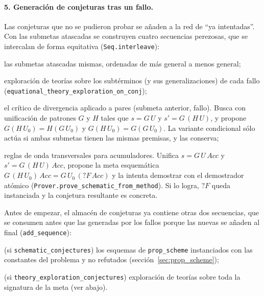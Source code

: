 \documentclass[11pt,a4paper]{article}
\newcommand{\isa}[1]{\texttt{#1}}
\theoremstyle{definition}
\theoremstyle{remark}
\begin{document}
\paragraph{5. Generación de conjeturas tras un fallo.}
Las conjeturas que no se pudieron probar se añaden a la red de ``ya intentadas''. Con
las submetas atascadas se construyen cuatro secuencias perezosas, que se intercalan
de forma equitativa (\isa{Seq.interleave}):
\begin{description}[nosep,font=\normalfont\ttfamily]
  \item[EQ\_FROM\_FAILURE] las submetas atascadas mismas, ordenadas de más general
        a menos general;
  \item[TX\_ON\_FAILURES] exploración de teorías sobre los subtérminos (y sus
        generalizaciones) de cada fallo
        (\isa{equational\_theory\_exploration\_on\_conj});
  \item[WALSH] el crítico de divergencia aplicado a pares (submeta anterior, fallo).
        Busca con unificación de patrones $G$ y $H$ tales que $s = G\,U$ y
        $s' = G\,(H\,U)$, y propone $G(H\,U_0) = H(G\,U_0)$ y
        $G(H\,U_0) = G(G\,U_0)$. La variante condicional sólo actúa si ambas
        submetas tienen las mismas premisas, y las conserva;
  \item[TRANSVERSE] reglas de onda transversales para acumuladores. Unifica
        $s = G\,U\,\mathit{Acc}$ y $s' = G\,(H\,U)\,\mathit{Acc}$, propone la meta
        esquemática $G\,(H\,U_0)\,\mathit{Acc} = G\,U_0\,(?F\,\mathit{Acc})$ y la
        intenta demostrar con el demostrador atómico
        (\isa{Prover.prove\_schematic\_from\_method}). Si lo logra, $?F$ queda
        instanciada y la conjetura resultante es concreta.
\end{description}
Antes de empezar, el almacén de conjeturas ya contiene otras dos secuencias, que se
consumen antes que las generadas por los fallos porque las nuevas se añaden al final
(\isa{add\_sequence}):
\begin{description}[nosep,font=\normalfont\ttfamily]
  \item[EQ\_KNOWN] (si \isa{schematic\_conjectures}) los esquemas de
        \isa{prop\_scheme} instanciados con las constantes del problema y no
        refutados (sección~\ref{sec:prop_scheme});
  \item[EQ\_TX] (si \isa{theory\_exploration\_conjectures}) exploración de teorías
        sobre toda la signatura de la meta (ver abajo).
\end{description}
\end{document}
